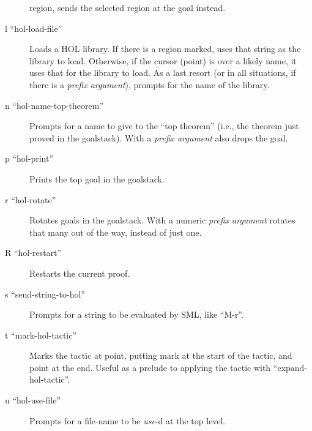 \documentclass[10pt]{article}
\begin{document}
\begin{description}
  region, sends the selected region at the goal instead.
\item [l ``hol-load-file''] Loads a HOL library.  If there is a region
  marked, uses that string as the library to load.  Otherwise, if the
  cursor (point) is over a likely name, it uses that for the library
  to load.  As a last resort (or in all situations, if there is a
  \emph{prefix argument}), prompts for the name of the library.
\item [n ``hol-name-top-theorem''] Prompts for a name to give to the
  ``top theorem'' (i.e., the theorem just proved in the goalstack).
  With a \emph{prefix argument} also drops the goal.
\item [p ``hol-print''] Prints the top goal in the goalstack.
\item [r ``hol-rotate''] Rotates goals in the goalstack.  With a
  numeric \emph{prefix argument} rotates that many out of the way,
  instead of just one.
\item [R ``hol-restart''] Restarts the current proof.
\item [s ``send-string-to-hol''] Prompts for a string to be evaluated
  by SML, like ``M-r''.
\item [t ``mark-hol-tactic''] Marks the tactic at point, putting mark
  at the start of the tactic, and point at the end.  Useful as a
  prelude to applying the tactic with ``expand-hol-tactic''.
\item [u ``hol-use-file''] Prompts for a file-name to be \emph{use}-d
  at the top level.

\end{description}
\end{document}
